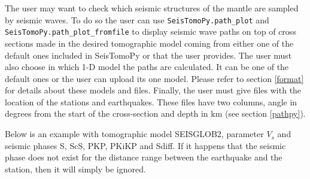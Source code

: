 \documentclass[12pt]{article}
\begin{document}
The user may want to check which seismic structures of the mantle are
sampled by seismic waves. To do so the user can use \verb?SeisTomoPy.path_plot? and
\verb?SeisTomoPy.path_plot_fromfile? to display seismic wave paths on top of
cross sections made in the desired tomographic model coming from either
one of the default ones included in SeisTomoPy or that the user
provides. The user must also choose in which 1-D model the paths are calculated. It can be one of the default ones  or the user can upload its one model. Please refer to section \ref{format} for details about these models and files. Finally, the user must give files with the location of the stations and earthquakes. These files have two columns, angle in degrees from the start of the cross-section and depth in km (see section \ref{pathpy}).

Below is an example with tomographic model SEISGLOB2, parameter \(V_s\)
and seismic phases S, ScS, PKP, PKiKP and Sdiff. If it happens that the
seismic phase does not exist for the distance range between the
earthquake and the station, then it will simply be ignored.
\end{document}
